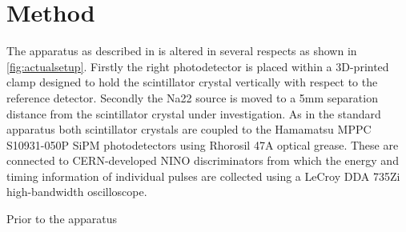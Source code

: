 \section{Method}
The apparatus as described in \cite{arron_Meyer_Pauwels_Lecoq_2012} is altered in several respects as shown in \ref{fig:actualsetup}. Firstly the right photodetector is placed within a 3D-printed clamp designed to hold the scintillator crystal vertically with respect to the reference detector. Secondly the Na22 source is moved to a 5mm separation distance from the scintillator crystal under investigation. As in the standard apparatus both scintillator crystals are coupled to the Hamamatsu MPPC S10931-050P SiPM photodetectors using Rhorosil 47A optical grease. These are connected to CERN-developed NINO discriminators from which the energy and timing information of individual pulses are collected using a LeCroy DDA 735Zi high-bandwidth oscilloscope.

Prior to the apparatus
